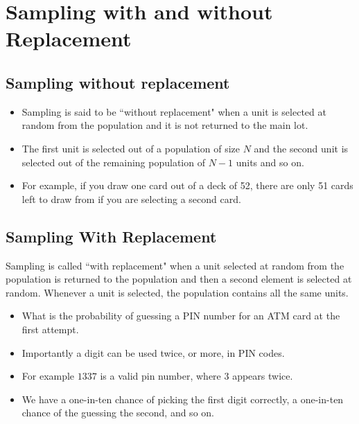 \documentclass[]{report}
\begin{document}

{
	\section{Sampling with and without Replacement}
	
	\subsection{Sampling without replacement}
	\begin{itemize}
		\item Sampling is said to be ``without replacement" when a unit is selected at random from the population and it is not returned to the main lot. \item The first unit is selected out of a population of size $N$ and the second unit is selected out of the remaining population of  $N-1$ units and so on.
		\item For example, if you draw one card out of a deck of 52, there are only 51 cards left to draw from if you are selecting a second card.
	\end{itemize}



	\subsection{Sampling With Replacement }
	
	Sampling is called ``with replacement" when a unit selected at random from the population is returned to the population and then a second element is selected at random. Whenever a unit is selected, the population contains all the same units.
	\begin{itemize}
		\item What is the probability of guessing a PIN number for an ATM card at the first attempt.
		
		\item Importantly a digit can be used twice, or more, in PIN codes.
		
		\item For example $1337$ is a valid pin number, where $3$ appears twice.
		
		\item
		We have a one-in-ten chance of picking the first digit correctly, a one-in-ten chance of the guessing the second, and so on.
		

\end{itemize}}
\end{document}

